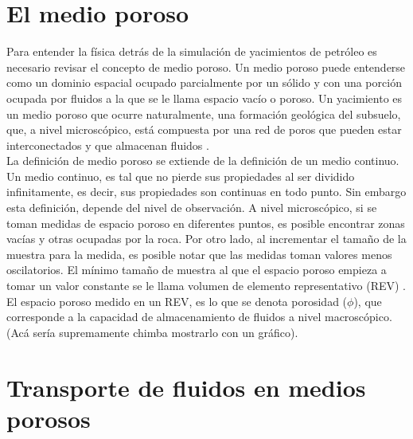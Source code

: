 \section{El medio poroso}

Para entender la física detrás de la simulación de yacimientos de petróleo es necesario revisar el concepto de medio poroso. Un medio poroso puede entenderse como un dominio espacial ocupado parcialmente por un sólido y con una porción ocupada por fluidos a la que se le llama espacio vacío o poroso. Un yacimiento es un medio poroso que ocurre naturalmente, una formación geológica del subsuelo, que, a nivel microscópico, está compuesta por una red de poros que pueden estar interconectados y que almacenan fluidos \citep{Bear2018}.\\

La definición de medio poroso se extiende de la definición de un medio continuo. Un medio continuo, es tal que no pierde sus propiedades al ser dividido infinitamente, es decir, sus propiedades son continuas en todo punto. Sin embargo esta definición, depende del nivel de observación. A nivel microscópico, si se toman medidas de espacio poroso en diferentes puntos, es posible encontrar zonas vacías y otras ocupadas por la roca. Por otro lado, al incrementar el tamaño de la muestra para la medida, es posible notar que las medidas toman valores menos oscilatorios. El mínimo tamaño de muestra al que el espacio poroso empieza a tomar un valor constante se le llama volumen de elemento representativo (REV) \citep{Bear2018}. El espacio poroso medido en un REV, es lo que se denota porosidad ($\phi$), que corresponde a la capacidad de almacenamiento de fluidos a nivel macroscópico.(Acá sería supremamente chimba mostrarlo con un gráfico).\\


\section{Transporte de fluidos en medios porosos}

